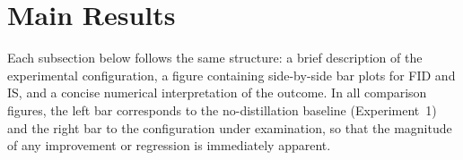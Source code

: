 %
%

\section{Main Results}
\label{sec:main_results}

Each subsection below follows the same structure: a brief description of the
experimental configuration, a figure containing side-by-side bar plots
for FID and IS, and a concise numerical interpretation of the outcome.
In all comparison figures, the left bar corresponds to the no-distillation
baseline (Experiment~1) and the right bar to the configuration under
examination, so that the magnitude of any improvement or regression is
immediately apparent.

